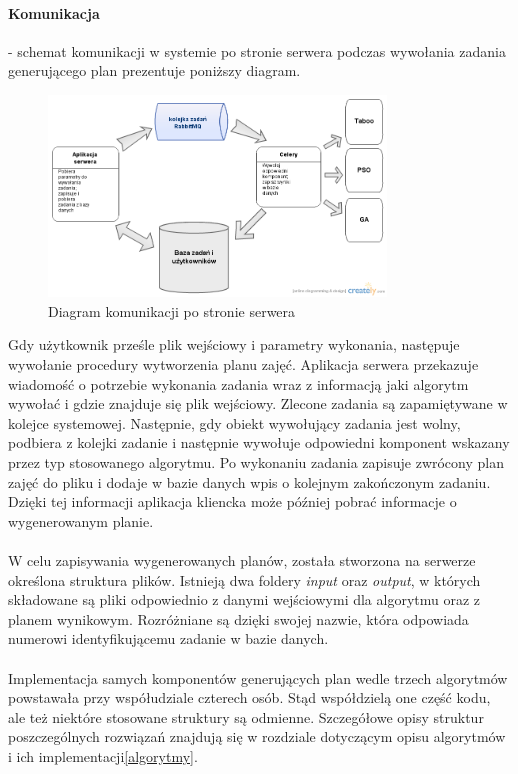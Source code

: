 \paragraph{Komunikacja} - schemat komunikacji w systemie po stronie serwera podczas wywołania zadania generującego plan prezentuje poniższy diagram.
\begin{figure}[H]
  \caption{Diagram komunikacji po stronie serwera}
  \centering
    \includegraphics[width=0.8\textwidth]{img/SystemCommunication.png}
\end{figure}
Gdy użytkownik prześle plik wejściowy i parametry wykonania, następuje wywołanie procedury wytworzenia planu zajęć. Aplikacja serwera przekazuje wiadomość o potrzebie wykonania zadania wraz z informacją jaki algorytm wywołać i gdzie znajduje się plik wejściowy. Zlecone zadania są zapamiętywane w kolejce systemowej. Następnie, gdy obiekt wywołujący zadania jest wolny, podbiera z kolejki zadanie i następnie wywołuje odpowiedni komponent wskazany przez typ stosowanego algorytmu. Po wykonaniu zadania zapisuje zwrócony plan zajęć do pliku i dodaje w bazie danych wpis o kolejnym zakończonym zadaniu. Dzięki tej informacji aplikacja kliencka może później pobrać informacje o wygenerowanym planie.
\paragraph{}W celu zapisywania wygenerowanych planów, została stworzona  na serwerze określona struktura plików. Istnieją dwa foldery \emph{input} oraz \emph{output}, w których składowane są pliki odpowiednio z danymi wejściowymi dla algorytmu oraz z planem wynikowym. Rozróżniane są dzięki swojej nazwie, która odpowiada numerowi identyfikującemu zadanie w bazie danych.
\paragraph{} Implementacja samych komponentów generujących plan wedle trzech algorytmów powstawała przy współudziale czterech osób. Stąd współdzielą one część kodu, ale też niektóre stosowane struktury są odmienne. Szczegółowe opisy struktur poszczególnych rozwiązań znajdują się w rozdziale dotyczącym opisu algorytmów i ich implementacji\ref{algorytmy}.